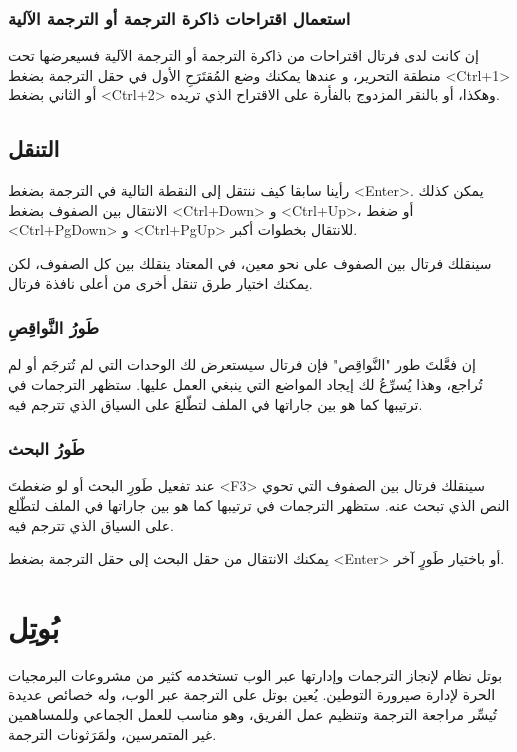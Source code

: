 \subsubsection[ref:36543315]{استعمال اقتراحات ذاكرة الترجمة أو الترجمة الآلية}


إن كانت لدى فرتال اقتراحات من ذاكرة الترجمة أو الترجمة الآلية فسيعرضها
تحت منطقة التحرير، و عندها يمكنك وضع المُقتَرَحِ الأول في حقل الترجمة
بضغط <Ctrl+1> أو الثاني بضغط <Ctrl+2> وهكذا، أو بالنقر المزدوج بالفأرة
على الاقتراح الذي تريده.

\subsection{التنقل}
رأينا سابقا كيف ننتقل إلى النقطة التالية في الترجمة بضغط <Enter>. يمكن
كذلك الانتقال بين الصفوف بضغط <Ctrl+Down> و <Ctrl+Up>، أو ضغط
<Ctrl+PgDown> و <Ctrl+PgUp> للانتقال بخطوات أكبر.

سينقلك فرتال بين الصفوف على نحو معين، في المعتاد ينقلك بين كل الصفوف،
لكن يمكنك اختيار طرق تنقل أخرى من أعلى نافذة فرتال.

\subsubsection{طَورُ النَّواقِصِ}
إن فعَّلتَ طور "النَّواقِص" فإن فرتال سيستعرض لك الوحدات التي لم تُترجَم
أو لم تُراجع، وهذا يُسرِّعُ لك إيجاد المواضع التي ينبغي العمل عليها.
ستظهر الترجمات في ترتيبها كما هو بين جاراتها في الملف لتطّلعَ على
السياق الذي تترجم فيه.

\subsubsection{طَورُ البحث}
عند تفعيل طَورِ البحث أو لو ضغطتَ <F3> سينقلك فرتال بين الصفوف التي تحوي
النص الذي تبحث عنه. ستظهر الترجمات في ترتيبها كما هو بين جاراتها في
الملف لتطّلع على السياق الذي تترجم فيه.

يمكنك الانتقال من حقل البحث إلى حقل الترجمة بضغط <Enter> أو باختيار
طَورٍ آخر.

\section{بُوتِل}
بوتل نظام لإنجاز الترجمات وإدارتها عبر الوب تستخدمه كثير من مشروعات
البرمجيات الحرة لإدارة صيرورة التوطين. يُعين بوتل على الترجمة عبر الوب،
وله خصائص عديدة تُيسِّر مراجعة الترجمة وتنظيم عمل الفريق، وهو مناسب
للعمل الجماعي وللمساهمين غير المتمرسين، ولمَرَثونات الترجمة.

